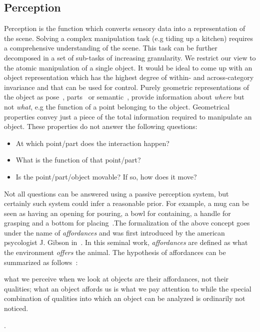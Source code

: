 \subsection{Perception}
Perception is the function which converts sensory data into a representation of the scene. Solving a complex manipulation task (e.g tiding up a kitchen) requires a comprehensive understanding of the scene. This task can be further decomposed in a set of sub-tasks of increasing granularity. We restrict our view to the atomic manipulation of a single object. It would be ideal to come up with an object representation which has the highest degree of within- and across-category invariance and that can be used for control. Purely geometric representations of the object as pose~\cite{xiang2017posecnn}, parts~\cite{li2020category} or semantic~\cite{jang2017end}, provide information about \emph{where} but not \emph{what}, e.g the function of a point belonging to the object. Geometrical properties convey just a piece of the total information required to manipulate an object. These properties do not answer the following questions:
\begin{itemize}
\item At which point/part does the interaction happen?
\item What is the function of that point/part?
\item Is the point/part/object movable? If so, how does it move?
\end{itemize}     
Not all questions can be answered using a passive perception system, but certainly such system could infer a reasonable prior. For example, a mug can be seen as having an opening for pouring, a bowl for containing, a handle for grasping and a bottom for placing~\cite{fagg1998modeling}.The formalization of the above concept goes under the name of \emph{affordances} and was first introduced by the american psycologist J. Gibson in~\cite{gibson1977theory}. In this seminal work, \emph{affordances} are defined as what the environment \emph{offers} the animal. The hypothesis of affordances can be summarized as follows~\cite{gibson1977theory}:
\begin{displayquote}
 what we perceive when we look at objects are their affordances, not their qualities; what an object affords us is what we pay attention to while the special combination of qualities into which an object can be analyzed is ordinarily not noticed. 
\end{displayquote}. 

